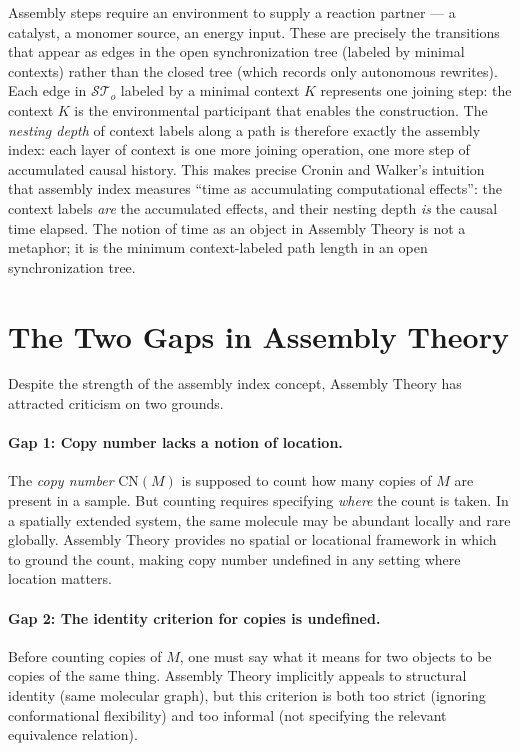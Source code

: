 \begin{remark}
Assembly steps require an environment to supply a reaction partner ---
a catalyst, a monomer source, an energy input.
These are precisely the transitions that appear as edges in the
open synchronization tree (labeled by minimal contexts) rather than
the closed tree (which records only autonomous rewrites).
Each edge in $\mathcal{ST}_o$ labeled by a minimal context $K$
represents one joining step: the context $K$ is the environmental
participant that enables the construction.
The \emph{nesting depth} of context labels along a path is
therefore exactly the assembly index: each layer of context is
one more joining operation, one more step of accumulated causal
history.
This makes precise Cronin and Walker's intuition that assembly
index measures ``time as accumulating computational effects'':
the context labels \emph{are} the accumulated effects, and their
nesting depth \emph{is} the causal time elapsed.
The notion of time as an object in Assembly Theory is not a
metaphor; it is the minimum context-labeled path length in an
open synchronization tree.
\end{remark}

\section{The Two Gaps in Assembly Theory}
Despite the strength of the assembly index concept, Assembly Theory
has attracted criticism on two grounds.

\paragraph{Gap 1: Copy number lacks a notion of location.}
The \emph{copy number} $\mathrm{CN}(M)$ is supposed to count how
many copies of $M$ are present in a sample.
But counting requires specifying \emph{where} the count is taken.
In a spatially extended system, the same molecule may be abundant
locally and rare globally.
Assembly Theory provides no spatial or locational framework in which
to ground the count, making copy number undefined in any setting
where location matters.

\paragraph{Gap 2: The identity criterion for copies is undefined.}
Before counting copies of $M$, one must say what it means for two
objects to be copies of the same thing.
Assembly Theory implicitly appeals to structural identity (same
molecular graph), but this criterion is both too strict (ignoring
conformational flexibility) and too informal (not specifying the
relevant equivalence relation).

